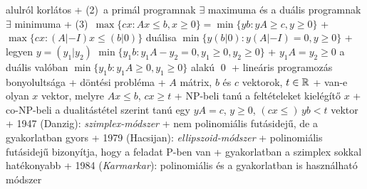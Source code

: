       alulról korlátos
    + (2)~a primál programnak $\exists$ maximuma és a duális programnak
      $\exists$ minimuma
    + (3)~$\max \{ cx : Ax \le b, x \ge 0 \} = \min \{ yb : yA \ge c,
      y \ge 0 \}$
  + \proof $\max \{ cx : (A | {-I}) x \le (b | 0) \}$ duálisa $\min \{ y
    (b | 0) : y (A | {-I}) = 0, y \ge 0 \}$
    + legyen $y = (y_1 | y_2)$ \RA $\min \{ y_1 b : y_1 A - y_2 = 0,
      y_1 \ge 0, y_2 \ge 0\}$
    + $y_1 A = y_2 \ge 0$ \RA a duális valóban
      $\min \{ y_1 b : y_1 A \ge 0, y_1 \ge 0 \}$ alakú \qed
+ lineáris programozás bonyolultsága
  + döntési probléma
    + \DataIn $A$ mátrix, $b$ és $c$ vektorok, $t \in \mathbb{R}$
    + \DataOut van-e olyan $x$ vektor, melyre $Ax \le b$, $cx \ge t$
  + NP-beli \ra tanú a feltételeket kielégítő $x$
  + co-NP-beli \ra a dualitástétel szerint tanú egy $yA = c$, $y \ge
    0$, $(cx \le )\,yb < t$ vektor
  + 1947 (Danzig): \emph{szimplex-módszer}
    + nem polinomiális futásidejű, de a gyakorlatban gyors
  + 1979 (Hacsijan): \emph{ellipszoid-módszer}
    + polinomiális futásidejű \RA bizonyítja, hogy a feladat P-ben van
    + gyakorlatban a szimplex sokkal hatékonyabb
  + 1984 (\emph{Karmarkar}): polinomiális és a gyakorlatban is használható módszer


